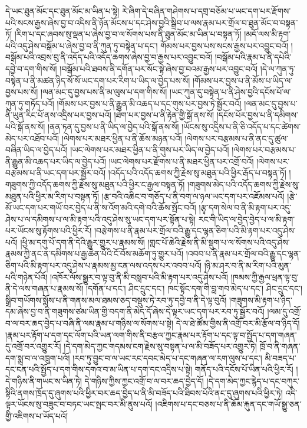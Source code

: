 དེ་ཡང་ཐུན་མོང་དང་ཐུན་མོང་མ་ཡིན་པ་སྟེ། རེ་ཞིག་དེ་བཞིན་གཤེགས་པ་དགྲ་བཅོམ་པ་ཡང་དག་པར་རྫོགས་པའི་སངས་རྒྱས་ཞེས་བྱ་བ་འདིས་ནི་ཉོན་མོངས་པ་དང་ཤེས་བྱའི་སྒྲིབ་པ་ལས་རྣམ་པར་གྲོལ་བ་ཐུན་མོང་བ་བསྟན་ཏོ། །རིག་པ་དང་ཞབས་སུ་ལྡན་པ་ཞེས་བྱ་བ་ལ་སོགས་པས་ནི་ཐུན་མོང་མ་ཡིན་པ་བསྟན་ཏོ། །མདོ་ལས་མི་རྟག་པའི་འདུ་ཤེས་བསྒོམ་པ་ཞེས་བྱ་བ་ནི་ཀུན་ཏུ་བསྟེན་པ་དང་། གོམས་པར་བྱས་པས་སངས་རྒྱས་པར་འབྱུང་བའོ། །བསྒོམ་པའི་འབྲས་བུ་ནི་འདོད་པའི་འདོད་ཆགས་ཞེས་བྱ་བ་རྒྱས་པར་འབྱུང་བའོ། །བསྒོམ་པའི་རྣམ་པ་ནི་དཔེའི་དབྱེ་བ་དག་གིས་སོ། །བསྒོམ་པའི་ཐབས་ནི་དགོན་པར་སོང་སྟེ་ཞེས་བྱ་བའམ་རྒྱས་པར་འབྱུང་བའོ། །དེ་ལ་ཀུན་ཏུ་བསྟེན་པ་ནི་མཚན་ཉིད་སོ་སོ་ཡང་དག་པར་རིག་པ་ཡིད་ལ་བྱེད་པས་སོ། །གོམས་པར་བྱས་པ་ནི་མོས་པ་ཡིད་ལ་བྱས་པས་སོ། །ལན་མང་དུ་བྱས་པས་ནི་མ་ལུས་པ་དག་གིས་སོ། །ཡང་ཀུན་དུ་བསྟེན་པ་ནི་ཤེས་བྱའི་དངོས་པོ་ལ་ཀུན་ཏུ་གཏོད་པའོ། །གོམས་པར་བྱས་པ་ནི་རྒྱུན་མི་འཆད་པ་དང་གུས་པར་བྱས་ཏེ་སྦྱོར་བའོ། །ལན་མང་དུ་བྱས་པ་ནི་ཡུན་རིང་པོ་ནས་འདྲིས་པར་བྱས་པའོ། །ཐེག་པར་བྱས་པ་ནི་རྟེན་གྱི་སྒོ་ནས་སོ། །དངོས་པོར་བྱས་པ་ནི་དམིགས་པའི་སྒོ་ནས་སོ། །ནན་ཏན་དུ་བྱས་པ་ནི་ཡིད་ལ་བྱེད་པའི་སྒོ་ནས་སོ། །ཡོངས་སུ་འདྲིས་པ་ནི་ཅི་འདོད་པ་དང་ཚེགས་མེད་པར་འཐོབ་པའོ། །ལེགས་པར་མཐར་ཕྱིན་པ་ནི་ཆོས་མཉན་པའོ། །ལེགས་པར་བརྩམས་པ་ནི་ནང་དུ་ཚུལ་བཞིན་ཡིད་ལ་བྱེད་པའོ། །ཡང་ལེགས་པར་མཐར་ཕྱིན་པ་ནི་གུས་པར་ཡིད་ལ་བྱེད་པའོ། །ལེགས་པར་བརྩམས་པ་ནི་རྒྱུན་མི་འཆད་པར་ཡིད་ལ་བྱེད་པའོ། །ཡང་ལེགས་པར་རྫོགས་པ་ནི་མཐར་ཕྱིན་པར་འགྲོ་བའོ། །ལེགས་པར་བརྩམས་པ་ནི་ཡང་དག་པར་སྦྱོར་བའོ། །འདོད་པའི་འདོད་ཆགས་ཀྱི་རྗེས་སུ་མཐུན་པའི་ཕྱིར་རྒོད་པ་བསྟན་ཏོ། །གཟུགས་ཀྱི་འདོད་ཆགས་ཀྱི་རྗེས་སུ་མཐུན་པའི་ཕྱིར་ང་རྒྱལ་བསྟན་ཏོ། །གཟུགས་མེད་པའི་འདོད་ཆགས་ཀྱི་རྗེས་སུ་མཐུན་པའི་ཕྱིར་མ་རིག་པ་བསྟན་ཏོ། །རྩ་བའི་འཆིང་བ་གཅོད་པ་ནི་བག་ལ་ཉལ་ཡང་དག་པར་འཇོམས་པའོ། །རྩེ་མོ་ཡང་དག་པར་གཡོ་བར་བྱེད་པ་ནི་ས་འོག་མའི་དགེ་བའི་ཆོས་སྤོང་བའོ། །རྩྭ་དག་སེལ་བ་ནི་མི་རྟག་པར་འདུ་ཤེས་པ་ལ་དམིགས་པ་ལ་མི་རྟག་པའི་འདུ་ཤེས་སུ་ཡང་དག་པར་སྟོན་པ་སྟེ། རང་གི་ཡིད་ལ་བྱེད་བྱེད་པ་ལ་མི་རྟག་པར་ཡོངས་སུ་རྟོགས་པའི་ཕྱིར་རོ། །བརྩེགས་པ་ནི་རྣམ་པར་གྲོལ་བའི་རྒྱུ་དང་ལྷན་ཅིག་པའི་མི་རྟག་པར་འདུ་ཤེས་པའོ། །ཕྱི་མ་དགུ་པོ་དག་ནི་དེའི་རྒྱུར་གྱུར་པ་རྣམས་སོ། །གླང་པོ་ཆེའི་རྗེས་ནི་མི་སྡུག་པ་ལ་སོགས་པའི་འདུ་ཤེས་རྣམས་ཀྱི་ནང་ན་དམིགས་པ་རྒྱ་ཆེན་པོའི་ངོ་བོས་མཆོག་ཏུ་གྱུར་པའོ། །འབབ་པ་ནི་རྣམ་པར་གྲོལ་བའི་རྒྱུ་དང་ལྷན་ཅིག་པའི་མི་རྟག་པར་འདུ་ཤེས་པ་རྣམས་མྱ་ངན་ལས་འདས་པར་འབབ་པའོ། །ཉི་མ་ཤར་བ་ནི་མ་རིག་པའི་མུན་པའི་གཉེན་པོའོ། །འཁོར་ལོས་སྒྱུར་བ་ལྟ་བུ་ནི་མི་བསླབ་པའི་མི་རྟག་པར་འདུ་ཤེས་པའོ། །ཁམས་ཀྱི་རྒྱལ་ཕྲན་ལྟ་བུ་ནི་དེ་ལས་གཞན་པ་རྣམས་སོ། །དགོན་པ་དང་། ཤིང་དྲུང་དང་། ཁང་སྟོང་དག་གི་བླ་གབ་མེད་པ་དང་། ཤིང་དྲུང་དང་། སྒྲིབ་གཡོགས་སྨོས་པ་ནི་གནས་མལ་ཐམས་ཅད་བསྡུས་ཏེ་རབ་ཏུ་དབྱེ་བ་ནི་དེ་ལྟ་བུའོ། །གཟུགས་མི་རྟག་པ་ཉིད་དམ་ཞེས་བྱ་བ་ནི་གཟུགས་ཙམ་ཡིན་གྱི་བདག་ནི་མེད་དོ་ཞེས་དེ་ལྟར་ཡང་དག་པར་རབ་ཏུ་སྦྱོར་བའོ། །ལམ་དུ་འགྲོ་བ་ལ་བར་ཆད་བྱེད་པ་བཞི་ནི་ལམ་རྣམ་པ་གཉིས་ལ་སོགས་པ་སྟེ། དེ་ལ་ཐེ་ཚོམ་གྱིས་ནི་འགྲོ་བར་མི་རྩོལ་བ་ཉིད་དོ། །རྣམ་པར་རྟོག་པ་དག་དང་ལོག་པའི་ཡན་ལག་གིས་ནི་བརྩལ་ཀྱང་རྣམ་པར་རྟོག་པ་དང་ལྟ་བ་སྤྱོད་པ་དག་གཞན་དུ་འགྲོ་བར་འགྱུར་རོ། །དེ་དག་མེད་ཀྱང་གདམས་ངག་རྗེས་སུ་བསྟན་པ་ལ་མི་བཟོད་པར་འགྱུར་ཏེ། ཁྲོ་བ་ནི་གཞན་དག་སྨྲ་བ་ལ་འཁྲུག་པའོ། །རབ་ཏུ་བྱུང་བ་ལ་ཡང་རང་དབང་མེད་པ་དང་གཞན་ལ་རག་ལུས་པ་དང་། མི་བཟད་པ་དང་ངན་པའི་སྤྱོད་པ་དག་གིས་དགའ་བ་མ་ཡིན་པ་དག་དང་འདྲིས་པ་སྟེ། གནོད་པའི་དངོས་པོ་ཡིན་པའི་ཕྱིར་རོ། །དེ་གཉིས་ནི་གཡང་ས་ཡིན་ཏེ། དེ་གཉིས་ཀྱིས་ཀྱང་འགྲོ་བ་ལ་བར་ཆད་བྱེད་དོ། །དེ་དག་མེད་ཀྱང་རྙེད་པ་དང་བཀུར་སྟིའི་ནགས་ཁྲོད་དུ་ཞུགས་པའི་ཕྱིར་བར་ཆད་བྱེད་པ་ནི་མི་བཟོད་པའི་ཐིབས་པོའི་ནང་དུ་ཞུགས་པའི་ཕྱིར་ཏེ། འདི་ལྟར་ཡོངས་སུ་བཟུང་བ་བཏང་ཡང་སྤང་བར་མི་ནུས་པའོ། །འཇིགས་པ་དང་བཅས་པ་ནི་ཆོམ་རྐུན་དང་གཡོ་སྒྱུ་ཅན་གྱི་འཇིགས་པ་ཡོད་པའོ། 